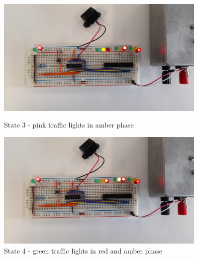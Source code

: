 \begin{figure}[H]
    \begin{minipage}{0.45\textwidth}
        \centering
        \includegraphics[width=0.9\textwidth]{images/final-testing/state_3.jpg}
        \caption{State 3 - pink traffic lights in amber phase}
        \label{fig:state_3}
    \end{minipage}\hfill
    \begin{minipage}{0.45\textwidth}
        \centering
        \includegraphics[width=0.9\textwidth]{images/final-testing/state_4.jpg}
        \caption{State 4 - green traffic lights in red and amber phase}
        \label{fig:state_4}
    \end{minipage}
\end{figure}
